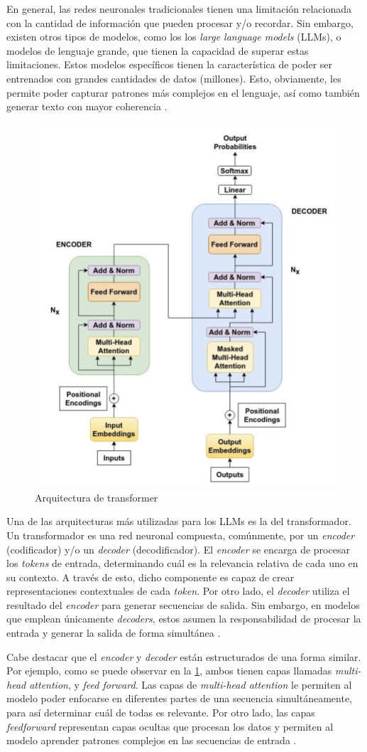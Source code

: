En general, las redes neuronales tradicionales tienen una limitación relacionada con la cantidad de información que pueden procesar y/o recordar. Sin embargo, existen otros tipos de modelos, como los los \textit{large language models} (LLMs), o modelos de lenguaje grande, que tienen la capacidad de superar estas limitaciones. Estos modelos específicos tienen la característica de poder ser entrenados con grandes cantidades de datos (millones). Esto, obviamente, les permite poder capturar patrones más complejos en el lenguaje, así como también generar texto con mayor coherencia \cite{twentyfour}.

\begin{figure}[H]
  \centering
  \includegraphics[width=0.5\linewidth]{figuras/TRANSFORMER.png}
  \caption{Arquitectura de transformer}
  \label{fig:TRANSFORMER}
\end{figure}

Una de las arquitecturas más utilizadas para los LLMs es la del transformador. Un transformador es una red neuronal compuesta, comúnmente, por un \textit{encoder} (codificador) y/o un \textit{decoder} (decodificador). El \textit{encoder} se encarga de procesar los \textit{tokens} de entrada, determinando cuál es la relevancia relativa de cada uno en su contexto. A través de esto, dicho componente es capaz de crear representaciones contextuales de cada \textit{token}. Por otro lado, el \textit{decoder} utiliza el resultado del \textit{encoder} para generar secuencias de salida. Sin embargo, en modelos que emplean únicamente \textit{decoders}, estos asumen la responsabilidad de procesar la entrada y generar la salida de forma simultánea \cite{twentyfive}.

Cabe destacar que el \textit{encoder} y \textit{decoder} están estructurados de una forma similar. Por ejemplo, como se puede observar en la \ref{fig:TRANSFORMER}, ambos tienen capas llamadas \textit{multi-head attention}, y \textit{feed forward}. Las capas de \textit{multi-head attention} le permiten al modelo poder enfocarse en diferentes partes de una secuencia simultáneamente, para así determinar cuál de todas es relevante. Por otro lado, las capas \textit{feedforward} representan capas ocultas que procesan los datos y permiten al modelo aprender patrones complejos en las secuencias de entrada \cite{twentysix}. 









